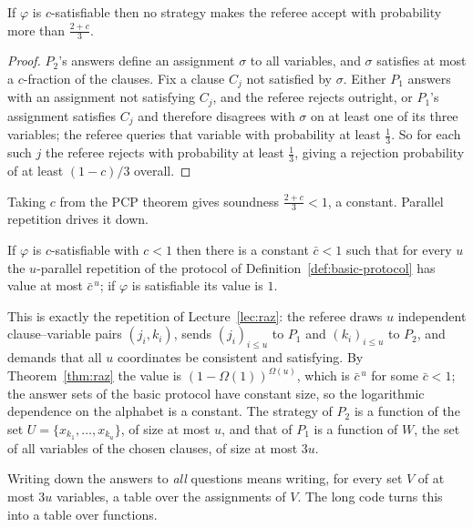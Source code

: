 \begin{lemma}\label{lem:basic-sound}
If $\varphi$ is $c$-satisfiable then no strategy makes the referee accept with probability more than $\tfrac{2+c}{3}$.
\end{lemma}
\begin{proof}
$P_2$'s answers define an assignment $\sigma$ to all variables, and $\sigma$ satisfies at most a $c$-fraction of the clauses.  Fix a clause $C_j$ not satisfied by $\sigma$.  Either $P_1$ answers with an assignment not satisfying $C_j$, and the referee rejects outright, or $P_1$'s assignment satisfies $C_j$ and therefore disagrees with $\sigma$ on at least one of its three variables; the referee queries that variable with probability at least $\tfrac13$.
So for each such $j$ the referee rejects with probability at least $\tfrac13$, giving a rejection probability of at least $(1-c)/3$ overall.
\end{proof}

\noindent
Taking $c$ from the PCP theorem gives soundness $\tfrac{2+c}{3}<1$, a constant.  Parallel repetition drives it down.

\begin{lemma}\label{lem:parallel-protocol}
If $\varphi$ is $c$-satisfiable with $c<1$ then there is a constant $\bar c<1$ such that for every $u$ the $u$-parallel repetition of the protocol of Definition~\ref{def:basic-protocol} has value at most $\bar c^{\,u}$; if $\varphi$ is satisfiable its value is $1$.
\end{lemma}

\noindent
This is exactly the repetition of Lecture~\ref{lec:raz}: the referee draws $u$ independent clause--variable pairs $(j_i,k_i)$, sends $(j_i)_{i\le u}$ to $P_1$ and $(k_i)_{i\le u}$ to $P_2$, and demands that all $u$ coordinates be consistent and satisfying.
By Theorem~\ref{thm:raz} the value is $(1-\Omega(1))^{\Omega(u)}$, which is $\bar c^{\,u}$ for some $\bar c<1$; the answer sets of the basic protocol have constant size, so the logarithmic dependence on the alphabet is a constant.
The strategy of $P_2$ is a function of the set $U=\{x_{k_1},\dots,x_{k_u}\}$, of size at most $u$, and that of $P_1$ is a function of $W$, the set of all variables of the chosen clauses, of size at most $3u$.

Writing down the answers to \emph{all} questions means writing, for every set $V$ of at most $3u$ variables, a table over the assignments of $V$.  The long code turns this into a table over functions.

